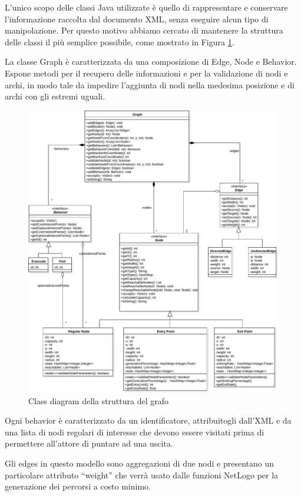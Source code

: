 L'unico scopo delle classi Java utilizzate è quello di rappresentare e conservare l'informazione raccolta dal documento XML, senza eseguire alcun tipo di manipolazione. Per questo motivo abbiamo cercato di mantenere la struttura delle classi il più semplice possibile, come mostrato in Figura \ref{fig:graph-diagram}.

La classe Graph è caratterizzata da una composizione di Edge, Node e Behavior. Espone metodi per il recupero delle informazioni e per la validazione di nodi e archi, in modo tale da impedire l'aggiunta di nodi nella medesima posizione e di archi con gli estremi uguali.

\begin{figure}[htbp]
\centering
\includegraphics[width=\textwidth,height=\textheight,keepaspectratio]{images/graph-diagram.pdf}
\caption{Class diagram della struttura del grafo}
\label{fig:graph-diagram}
\end{figure}
Ogni behavior è caratterizzato da un identificatore, attribuitogli dall'XML e da una lista di nodi regolari di interesse che devono essere visitati prima di permettere all'attore di puntare ad una uscita.

Gli edges in questo modello sono aggregazioni di due nodi e presentano un particolare attributo “weight” che verrà usato dalle funzioni NetLogo per la generazione dei percorsi a costo minimo.

